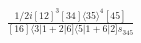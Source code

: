 \documentclass[varwidth, border=5pt]{standalone}
\begin{document}
\begin{my}
$\begin{gathered}
\scriptscriptstyle\frac{1/2i[12]^3[34]\langle35\rangle^4[45]}{[16]\langle3|1+2|6]\langle5|1+6|2]s_{345}}
\end{gathered}$
\end{my}
\end{document}
